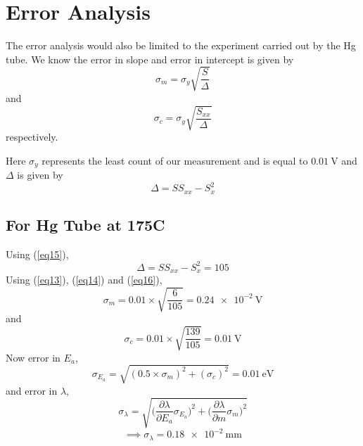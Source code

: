 \documentclass[%
 reprint,
 amsmath,amssymb,
 aps,
]{revtex4-2}
\begin{document}
\section{Error Analysis}
The error analysis would also be limited to the experiment carried out by the Hg tube. We know the error in slope and error in intercept is given by
\begin{equation}
\label{eq13}
    \sigma_m = \sigma_y \sqrt{\dfrac{S}{\Delta}}
\end{equation}
\noindent
and
\begin{equation}
\label{eq14}
    \sigma_c = \sigma_y \sqrt{\dfrac{S_{xx}}{\Delta}}
\end{equation}
\noindent
respectively.
\par
Here $\sigma_y$ represents the least count of our measurement and is equal to $\SI{0.01}{\volt}$ and $\Delta$ is given by
\begin{equation}
\label{eq15}
    \Delta = S S_{xx} - S_{x}^2
\end{equation}
    \subsection{For Hg Tube at 175\degree C}
        \noindent
        Using (\ref{eq15}),
        \begin{equation}
        \label{eq16}
            \Delta = S S_{xx} - S_{x}^2 = 105
        \end{equation}
        Using (\ref{eq13}), (\ref{eq14}) and (\ref{eq16}), 
        \begin{equation}
        \label{eq17}
            \sigma_m = 0.01 \times \sqrt{\dfrac{6}{105}} = \SI{0.24e-2}{\volt} 
        \end{equation}
        and
        \begin{equation}
        \label{eq18}
            \sigma_c = 0.01 \times \sqrt{\dfrac{139}{105}} = \SI{0.01}{\volt} 
        \end{equation}
        Now error in $E_a$,
        \begin{equation}
        \label{eq19}
            \boxed{\sigma_{E_{a}} = \sqrt{(0.5 \times \sigma_m)^2 + (\sigma_c)^2} = \SI{0.01}{\electronvolt}}
        \end{equation}
        and error in $\lambda$, 
        \begin{equation}
        \label{eq20}
            \sigma_{\lambda} = \sqrt{\Bigg(\dfrac{\partial \lambda}{\partial E_a}\sigma_{E_{a}}\Bigg)^2 + \Bigg(\dfrac{\partial \lambda}{\partial m}\sigma_m\Bigg)^2}
        \end{equation}
        \begin{equation}
        \label{eq21}
            \implies \boxed{\sigma_{\lambda} = \SI{0.18e-2}{\milli \metre}}
        \end{equation}
\end{document}

